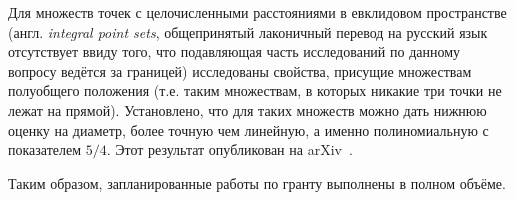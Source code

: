 \documentclass[a4paper,openbib]{report}
\theoremstyle{definition}
\begin{document}
Для множеств точек с целочисленными расстояниями в евклидовом пространстве
(англ. \textit{integral point sets}, общепринятый лаконичный перевод на русский язык отсутствует ввиду того,
что подавляющая часть исследований по данному вопросу ведётся за границей)
исследованы свойства, присущие множествам полуобщего положения
(т.е. таким множествам, в которых никакие три точки не лежат на прямой).
Установлено, что для таких множеств можно дать нижнюю оценку на диаметр,
более точную чем линейную, а именно полиномиальную с показателем $5/4$.
Этот результат опубликован на arXiv~\cite{my-semi-general-5-4-bound-2019}.



Таким образом, запланированные работы по гранту выполнены в полном объёме.




\small
\printbibliography{}
\end{document}
